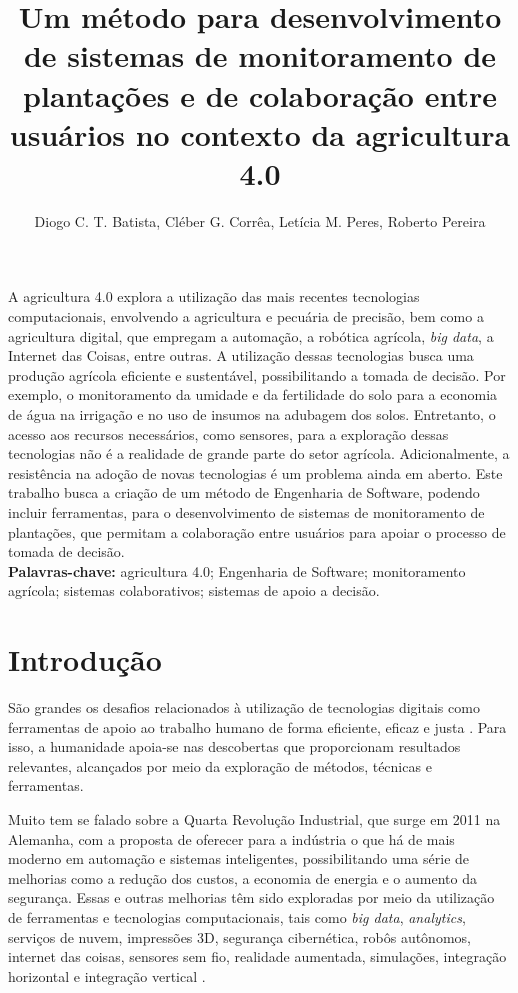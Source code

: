\documentclass[12pt]{article}
\title{Um método para desenvolvimento de sistemas de monitoramento de plantações e de colaboração entre usuários no contexto da agricultura 4.0}
\author{Diogo C. T. Batista\inst{1}, Cléber G. Corrêa\inst{1}, Letícia M. Peres\inst{2}, Roberto Pereira\inst{2}}
\begin{document}
 

\maketitle
     
\begin{resumo} 
A agricultura 4.0 explora a utilização das mais recentes tecnologias computacionais, envolvendo a agricultura e pecuária de precisão, bem como a agricultura digital, que empregam a automação, a robótica agrícola, \textit{big data}, a Internet das Coisas, entre outras. A utilização dessas tecnologias busca uma produção agrícola eficiente e sustentável, possibilitando a tomada de decisão. Por exemplo, o monitoramento da umidade e da fertilidade do solo para a economia de água na irrigação e no uso de insumos na adubagem dos solos. Entretanto, o acesso aos recursos necessários, como sensores, para a exploração dessas tecnologias não é a realidade de grande parte do setor agrícola. Adicionalmente, a resistência na adoção de novas tecnologias é um problema ainda em aberto. Este trabalho busca a criação de um método de Engenharia de Software, podendo incluir ferramentas, para o desenvolvimento de sistemas de monitoramento de plantações, que permitam a colaboração entre usuários para apoiar o processo de tomada de decisão. \\

\textbf{Palavras-chave:} agricultura 4.0; Engenharia de Software; monitoramento agrícola; sistemas colaborativos; sistemas de apoio a decisão.
\end{resumo}

\section{Introdução}
\label{sec:introducao}

São grandes os desafios relacionados à utilização de tecnologias digitais como ferramentas de apoio ao trabalho humano de forma eficiente, eficaz e justa \cite{Rose:2019}. Para isso, a humanidade apoia-se nas descobertas que proporcionam resultados relevantes, alcançados por meio da exploração de métodos, técnicas e ferramentas.

Muito tem se falado sobre a Quarta Revolução Industrial, que surge em 2011 na Alemanha, com a proposta de oferecer para a indústria o que há de mais moderno em automação e sistemas inteligentes, possibilitando uma série de melhorias como a redução dos custos, a economia de energia e o aumento da segurança. Essas e outras melhorias têm sido exploradas por meio da utilização de ferramentas e tecnologias computacionais, tais como \textit{big data}, \textit{analytics}, serviços de nuvem, impressões 3D, segurança cibernética, robôs autônomos, internet das coisas, sensores sem fio, realidade aumentada, simulações, integração horizontal e integração vertical \cite{Souza:2017}.
\end{document}

